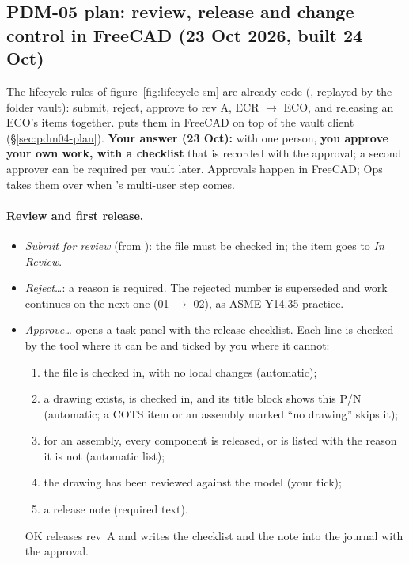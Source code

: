 \subsection{PDM-05 plan: review, release and change control in FreeCAD (23 Oct 2026, built 24 Oct)}\label{sec:pdm05-plan}

The lifecycle rules of figure~\ref{fig:lifecycle-sm} are already code (, replayed by the folder
vault): submit, reject, approve to rev A, ECR $\rightarrow$ ECO, and releasing an ECO's items together. 
puts them in FreeCAD on top of the vault client (\S\ref{sec:pdm04-plan}). \textbf{Your answer (23 Oct):} with one person,
\textbf{you approve your own work, with a checklist} that is recorded with the approval; a second approver can be required
per vault later. Approvals happen in FreeCAD; Ops takes them over when 's multi-user step comes.

\paragraph{Review and first release.}
\begin{itemize}[nosep]
  \item \emph{Submit for review} (from ): the file must be checked in; the item goes to \emph{In Review}.
  \item \emph{Reject\ldots}: a reason is required. The rejected number is superseded and work continues on the next
        one (01 $\rightarrow$ 02), as ASME Y14.35 practice.
  \item \emph{Approve\ldots} opens a task panel with the release checklist. Each line is checked by the tool where it
        can be and ticked by you where it cannot:
        \begin{enumerate}[nosep]
          \item the file is checked in, with no local changes (automatic);
          \item a drawing exists, is checked in, and its title block shows this P/N (automatic; a COTS item or an
                assembly marked ``no drawing'' skips it);
          \item for an assembly, every component is released, or is listed with the reason it is not (automatic list);
          \item the drawing has been reviewed against the model (your tick);
          \item a release note (required text).
        \end{enumerate}
        OK releases rev~A and writes the checklist and the note into the journal with the approval.
\end{itemize}

